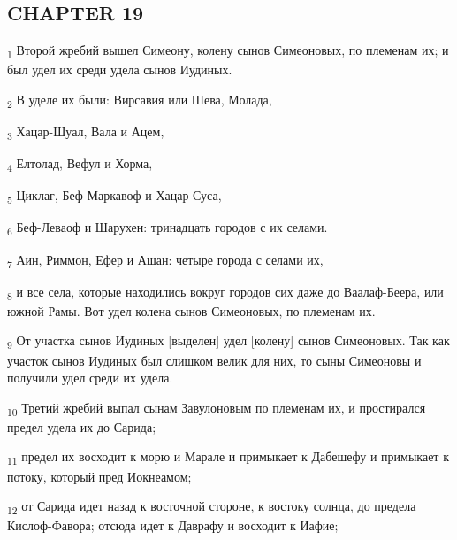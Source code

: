 \subsection{CHAPTER 19}
\begin{tcolorbox}
\textsubscript{1} Второй жребий вышел Симеону, колену сынов Симеоновых, по племенам их; и был удел их среди удела сынов Иудиных.
\end{tcolorbox}
\begin{tcolorbox}
\textsubscript{2} В уделе их были: Вирсавия или Шева, Молада,
\end{tcolorbox}
\begin{tcolorbox}
\textsubscript{3} Хацар-Шуал, Вала и Ацем,
\end{tcolorbox}
\begin{tcolorbox}
\textsubscript{4} Елтолад, Вефул и Хорма,
\end{tcolorbox}
\begin{tcolorbox}
\textsubscript{5} Циклаг, Беф-Маркавоф и Хацар-Суса,
\end{tcolorbox}
\begin{tcolorbox}
\textsubscript{6} Беф-Леваоф и Шарухен: тринадцать городов с их селами.
\end{tcolorbox}
\begin{tcolorbox}
\textsubscript{7} Аин, Риммон, Ефер и Ашан: четыре города с селами их,
\end{tcolorbox}
\begin{tcolorbox}
\textsubscript{8} и все села, которые находились вокруг городов сих даже до Ваалаф-Беера, или южной Рамы. Вот удел колена сынов Симеоновых, по племенам их.
\end{tcolorbox}
\begin{tcolorbox}
\textsubscript{9} От участка сынов Иудиных [выделен] удел [колену] сынов Симеоновых. Так как участок сынов Иудиных был слишком велик для них, то сыны Симеоновы и получили удел среди их удела.
\end{tcolorbox}
\begin{tcolorbox}
\textsubscript{10} Третий жребий выпал сынам Завулоновым по племенам их, и простирался предел удела их до Сарида;
\end{tcolorbox}
\begin{tcolorbox}
\textsubscript{11} предел их восходит к морю и Марале и примыкает к Дабешефу и примыкает к потоку, который пред Иокнеамом;
\end{tcolorbox}
\begin{tcolorbox}
\textsubscript{12} от Сарида идет назад к восточной стороне, к востоку солнца, до предела Кислоф-Фавора; отсюда идет к Даврафу и восходит к Иафие;
\end{tcolorbox}
